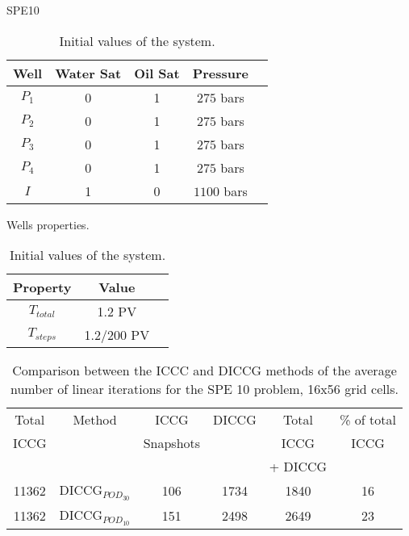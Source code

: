 \documentclass[12pt]{article}
\begin{document}
\newpage
SPE10 \\
\begin{table}[!ht]
\hspace{-0cm}
\begin{minipage}{.5\textwidth}
\centering
\begin{tabular}{ |c|c|c|c|c|} 
\hline
Well&Water Sat&Oil Sat&Pressure\\
\hline
$P_1$&     0&    1 & $275$ bars \\  
$P_2$& 0& 1& $275$ bars\\
$P_3$&     0&    1 & $275$ bars \\  
$P_4$& 0& 1& $275$ bars\\
$I$&     1&    0 & $1100$ bars\\  
\hline
\end{tabular}
\caption{Wells properties.}\label{table:wellsspe}
\end{minipage}%
\begin{minipage}{.4\textwidth}
\centering
\begin{tabular}{ |c|c|c|} 
\hline
Property&Value\\
\hline
    $T_{total}$&     1.2 PV\\
$T_{steps}$& 1.2/200 PV\\
\hline
\end{tabular}\caption{Initial values of the system.}
\label{table:icw}
\end{minipage}
\hspace{1cm} 
\end{table} 


\begin{table}[!ht]\centering
\begin{minipage}{1\textwidth}
 \centering
\begin{tabular}{ ||c||c|c|c|c|c||} 
\hline
Total&Method  & ICCG&DICCG &Total&\% of total\\ 
                            ICCG     &  & Snapshots& &ICCG& ICCG\\ 
                              &  & & &+ DICCG& \\   
                              \hline
11362& DICCG$_{POD_{30}}$&106&1734&1840&16 \\ 
\hline  
11362& DICCG$_{POD_{10}}$&151&2498&2649&23 \\ 
\hline  
\end{tabular} 
\caption{Comparison between the ICCC and DICCG methods of the average number of linear iterations for the SPE 10 problem, 16x56 grid cells. }\label{table:litertot2} 
\end{minipage}  
\end{table}  
\end{document}
